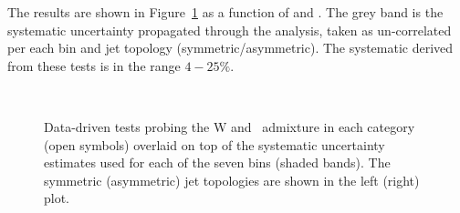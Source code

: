 The results are shown in Figure~\ref{fig:closureBTag} as a function of \scalht and \njet. 
The grey band is the systematic uncertainty propagated through the analysis, 
taken as un-correlated per each \scalht bin and jet topology (symmetric/asymmetric). The systematic derived from these tests is
in the range $4-25\%$.

\begin{figure}[h!]
  \begin{center}
    ~~
    \caption{Data-driven tests probing the W and \ttbar~admixture 
      in each \njet category (open symbols) overlaid on top of the systematic
      uncertainty estimates used for each of the seven \scalht bins
      (shaded bands). 
      The symmetric (asymmetric) jet topologies are shown in the left (right) plot.      
    }
    \label{fig:closureBTag}
  \end{center} 
\end{figure}

